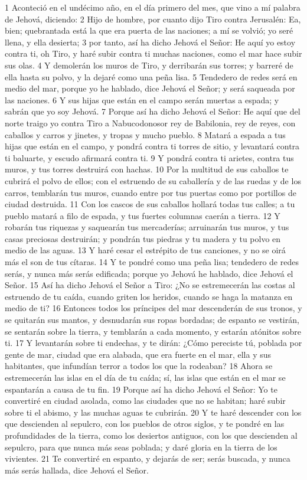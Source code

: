 1 Aconteció en el undécimo año, en el día primero del mes, que vino a mí palabra de Jehová, diciendo:
2 Hijo de hombre, por cuanto dijo Tiro contra Jerusalén: Ea, bien; quebrantada está la que era puerta de las naciones; a mí se volvió; yo seré llena, y ella desierta;
3 por tanto, así ha dicho Jehová el Señor: He aquí yo estoy contra ti, oh Tiro, y haré subir contra ti muchas naciones, como el mar hace subir sus olas.
4 Y demolerán los muros de Tiro, y derribarán sus torres; y barreré de ella hasta su polvo, y la dejaré como una peña lisa.
5 Tendedero de redes será en medio del mar, porque yo he hablado, dice Jehová el Señor; y será saqueada por las naciones.
6 Y sus hijas que están en el campo serán muertas a espada; y sabrán que yo soy Jehová.
7 Porque así ha dicho Jehová el Señor: He aquí que del norte traigo yo contra Tiro a Nabucodonosor rey de Babilonia, rey de reyes, con caballos y carros y jinetes, y tropas y mucho pueblo.
8 Matará a espada a tus hijas que están en el campo, y pondrá contra ti torres de sitio, y levantará contra ti baluarte, y escudo afirmará contra ti.
9 Y pondrá contra ti arietes, contra tus muros, y tus torres destruirá con hachas.
10 Por la multitud de sus caballos te cubrirá el polvo de ellos; con el estruendo de su caballería y de las ruedas y de los carros, temblarán tus muros, cuando entre por tus puertas como por portillos de ciudad destruida.
11 Con los cascos de sus caballos hollará todas tus calles; a tu pueblo matará a filo de espada, y tus fuertes columnas caerán a tierra.
12 Y robarán tus riquezas y saquearán tus mercaderías; arruinarán tus muros, y tus casas preciosas destruirán; y pondrán tus piedras y tu madera y tu polvo en medio de las aguas.
13 Y haré cesar el estrépito de tus canciones, y no se oirá más el son de tus cítaras. 
14 Y te pondré como una peña lisa; tendedero de redes serás, y nunca más serás edificada; porque yo Jehová he hablado, dice Jehová el Señor.
15 Así ha dicho Jehová el Señor a Tiro: ¿No se estremecerán las costas al estruendo de tu caída, cuando griten los heridos, cuando se haga la matanza en medio de ti?
16 Entonces todos los príncipes del mar descenderán de sus tronos, y se quitarán sus mantos, y desnudarán sus ropas bordadas; de espanto se vestirán, se sentarán sobre la tierra, y temblarán a cada momento, y estarán atónitos sobre ti.
17 Y levantarán sobre ti endechas, y te dirán: ¿Cómo pereciste tú, poblada por gente de mar, ciudad que era alabada, que era fuerte en el mar, ella y sus habitantes, que infundían terror a todos los que la rodeaban?
18 Ahora se estremecerán las islas en el día de tu caída; sí, las islas que están en el mar se espantarán a causa de tu fin. 
19 Porque así ha dicho Jehová el Señor: Yo te convertiré en ciudad asolada, como las ciudades que no se habitan; haré subir sobre ti el abismo, y las muchas aguas te cubrirán.
20 Y te haré descender con los que descienden al sepulcro, con los pueblos de otros siglos, y te pondré en las profundidades de la tierra, como los desiertos antiguos, con los que descienden al sepulcro, para que nunca más seas poblada; y daré gloria en la tierra de los vivientes.
21 Te convertiré en espanto, y dejarás de ser; serás buscada, y nunca más serás hallada, dice Jehová el Señor. 

